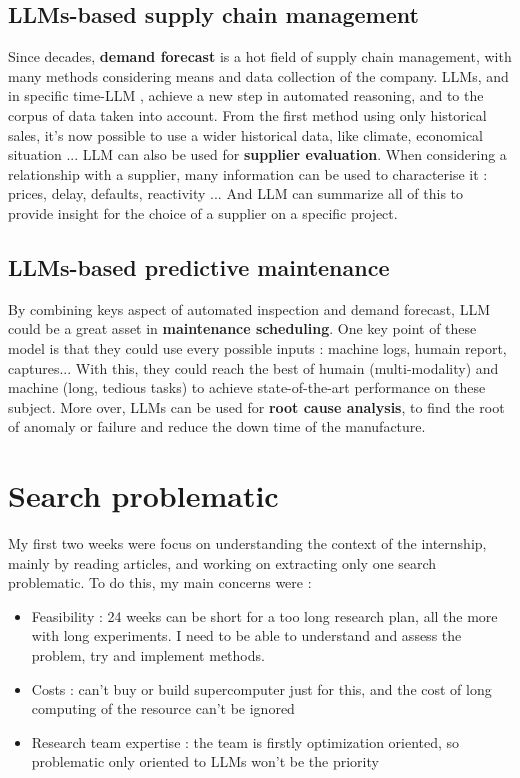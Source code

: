 \subsection{LLMs-based supply chain management}
\label{sec:llm_scm}
Since decades, \textbf{demand forecast} is a hot field of supply chain management, with many methods considering means and data collection of the company. LLMs, and in specific time-LLM \cite{timeLLM_2024}, achieve a new step in automated reasoning, and to the corpus of data taken into account. From the first method using only historical sales, it's now possible to use a wider historical data, like climate, economical situation ... LLM can also be used for \textbf{supplier evaluation}. When considering a relationship with a supplier, many information can be used to characterise it : prices, delay, defaults, reactivity ... And LLM can summarize all of this to provide insight for the choice of a supplier on a specific project.   


\subsection{LLMs-based predictive maintenance}
\label{sec:llm_pred_maint}
By combining keys aspect of automated inspection and demand forecast, LLM could be a great asset in \textbf{maintenance scheduling}. One key point of these model is that they could use every possible inputs : machine logs, humain report, captures... With this, they could reach the best of humain (multi-modality) and machine (long, tedious tasks) to achieve state-of-the-art performance on these subject. More over, LLMs can be used for \textbf{root cause analysis}, to find the root of anomaly or failure and reduce the down time of the manufacture. 

\section{Search problematic}
My first two weeks were focus on understanding the context of the internship, mainly by reading articles, and working on extracting only one search problematic. To do this, my main concerns were : 
\begin{itemize}
    \item Feasibility : 24 weeks can be short for a too long research plan, all the more with long experiments. I need to be able to understand and assess the problem, try and implement methods.
    \item Costs : can't buy or build supercomputer just for this, and the cost of long computing of the resource can't be ignored 
    \item Research team expertise : the team is firstly optimization oriented, so problematic only oriented to LLMs won't be the priority
\end{itemize}

